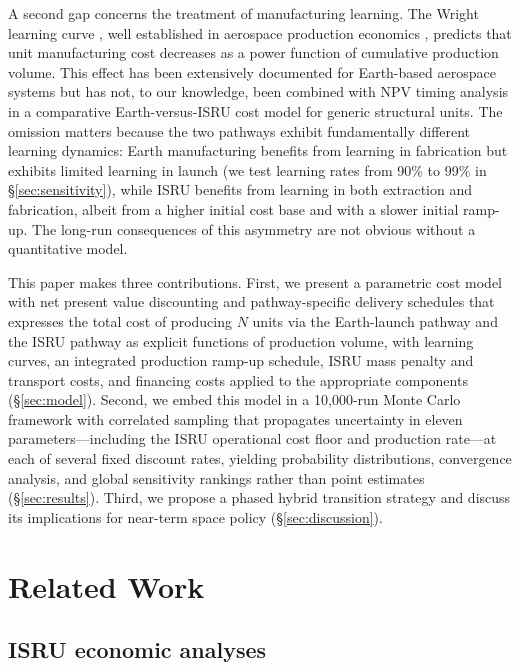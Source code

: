 \documentclass[preprint,12pt]{elsarticle}
\begin{document}
A second gap concerns the treatment of manufacturing learning. The Wright learning curve \cite{wright1936}, well established in aerospace production economics \cite{wertz2011}, predicts that unit manufacturing cost decreases as a power function of cumulative production volume. This effect has been extensively documented for Earth-based aerospace systems \cite{argote1990,nagy2013} but has not, to our knowledge, been combined with NPV timing analysis in a comparative Earth-versus-ISRU cost model for generic structural units. The omission matters because the two pathways exhibit fundamentally different learning dynamics: Earth manufacturing benefits from learning in fabrication but exhibits limited learning in launch (we test learning rates from 90\% to 99\% in \S\ref{sec:sensitivity}), while ISRU benefits from learning in both extraction and fabrication, albeit from a higher initial cost base and with a slower initial ramp-up. The long-run consequences of this asymmetry are not obvious without a quantitative model.

This paper makes three contributions. First, we present a parametric cost model with net present value discounting and pathway-specific delivery schedules that expresses the total cost of producing $N$ units via the Earth-launch pathway and the ISRU pathway as explicit functions of production volume, with learning curves, an integrated production ramp-up schedule, ISRU mass penalty and transport costs, and financing costs applied to the appropriate components (\S\ref{sec:model}). Second, we embed this model in a 10{,}000-run Monte Carlo framework with correlated sampling that propagates uncertainty in eleven parameters---including the ISRU operational cost floor and production rate---at each of several fixed discount rates, yielding probability distributions, convergence analysis, and global sensitivity rankings rather than point estimates (\S\ref{sec:results}). Third, we propose a phased hybrid transition strategy and discuss its implications for near-term space policy (\S\ref{sec:discussion}).

\section{Related Work}
\label{sec:related}

\subsection{ISRU economic analyses}
\end{document}
